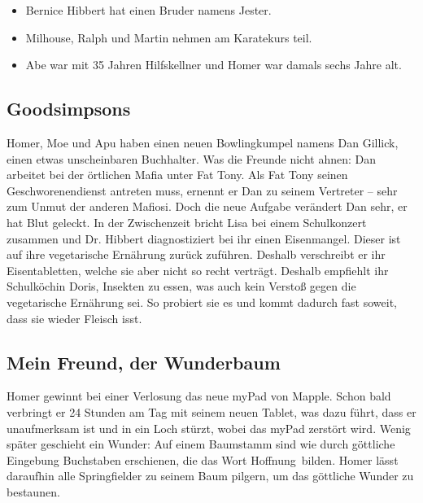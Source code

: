 \begin{itemize}
	\item Bernice Hibbert hat einen Bruder namens Jester.
	\item Milhouse, Ralph und Martin nehmen am Karatekurs teil.
	\item Abe war mit 35 Jahren Hilfskellner und Homer war damals sechs Jahre alt.
\end{itemize}

\subsection{Goodsimpsons}
Homer, Moe und Apu haben einen neuen Bowlingkumpel namens Dan Gillick, einen etwas unscheinbaren Buchhalter. Was die Freunde nicht ahnen: Dan arbeitet bei der örtlichen Mafia unter Fat Tony. Als Fat Tony seinen Geschworenendienst antreten muss, ernennt er Dan zu seinem Vertreter -- sehr zum Unmut der anderen Mafiosi. Doch die neue Aufgabe verändert Dan sehr, er hat Blut geleckt. In der Zwischenzeit bricht Lisa bei einem Schulkonzert zusammen und Dr. Hibbert diagnostiziert bei ihr einen Eisenmangel. Dieser ist auf ihre vegetarische Ernährung zurück zuführen. Deshalb verschreibt er ihr Eisentabletten, welche sie aber nicht so recht verträgt. Deshalb empfiehlt ihr Schulköchin Doris, Insekten zu essen, was auch kein Verstoß gegen die vegetarische Ernährung sei. So probiert sie es und kommt dadurch fast soweit, dass sie wieder Fleisch isst.


\subsection{Mein Freund, der Wunderbaum}\label{PABF22}
Homer gewinnt bei einer Verlosung das neue myPad von Mapple. Schon bald verbringt er 24 Stunden am Tag mit seinem neuen Tablet, was dazu führt, dass er unaufmerksam ist und in ein Loch stürzt, wobei das myPad zerstört wird. Wenig später geschieht ein Wunder: Auf einem Baumstamm sind wie durch göttliche Eingebung Buchstaben erschienen, die das Wort \glqq Hoffnung\grqq\ bilden. Homer lässt daraufhin alle Springfielder zu seinem Baum pilgern, um das göttliche Wunder zu bestaunen.

